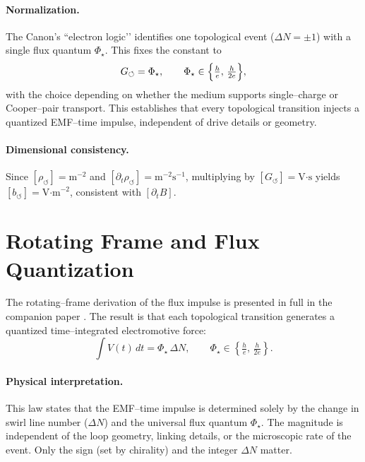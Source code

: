 \documentclass[11pt]{article}
\begin{document}
        \paragraph*{Normalization.}
        The Canon’s “electron logic’’ identifies one topological event ($\Delta N = \pm 1$) with a single flux
        quantum $\Phi_\star$. This fixes the constant to
        \[
        G_{\circlearrowleft} = \Phi_\star,
        \qquad
        \Phi_\star \in \Bigl\{ \tfrac{h}{e},\,\tfrac{h}{2e} \Bigr\},
        \]
        with the choice depending on whether the medium supports single–charge or Cooper–pair transport.
        This establishes that every topological transition injects a quantized EMF–time impulse, independent
        of drive details or geometry.

        \paragraph*{Dimensional consistency.}
        Since $[\rho_{\circlearrowleft}] = \text{m}^{-2}$ and $[\partial_t \rho_{\circlearrowleft}] =
        \text{m}^{-2}\text{s}^{-1}$, multiplying by $[G_{\circlearrowleft}] = \text{V·s}$ yields
        $[b_{\circlearrowleft}] = \text{V·m}^{-2}$, consistent with $[\partial_t B]$.

    \section{Rotating Frame and Flux Quantization}
    \label{sec:rotating-frame-and-flux-quantization}

        The rotating–frame derivation of the flux impulse is presented in full in the companion paper
        \cite{Iskandarani2025EMG}. The result is that each topological transition generates a quantized
        time–integrated electromotive force:
        \[
        \int V(t)\,dt = \Phi_\star \,\Delta N,
        \qquad
        \Phi_\star \in \left\{ \tfrac{h}{e}, \,\tfrac{h}{2e} \right\}.
        \]

        \paragraph*{Physical interpretation.}
        This law states that the EMF–time impulse is determined solely by the change in swirl line number
        ($\Delta N$) and the universal flux quantum $\Phi_\star$. The magnitude is independent of the loop
        geometry, linking details, or the microscopic rate of the event. Only the sign (set by chirality) and
        the integer $\Delta N$ matter.
\end{document}
